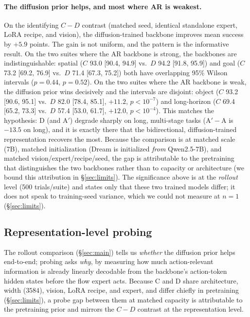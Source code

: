 \documentclass[conference]{IEEEtran}
\begin{document}
\paragraph{The diffusion prior helps, and most where AR is weakest.} On the
identifying $C-D$ contrast (matched seed, identical standalone expert, LoRA
recipe, and vision), the diffusion-trained backbone improves mean success by
$+5.9$ points. The gain is not uniform, and the pattern is the informative result.
On the two suites where the AR backbone is strong, the backbones are
indistinguishable: spatial ($C$ 93.0 [90.4, 94.9] vs.\ $D$ 94.2 [91.8, 95.9]) and
goal ($C$ 73.2 [69.2, 76.9] vs.\ $D$ 71.4 [67.3, 75.2]) both have overlapping 95\%
Wilson intervals ($p=0.44$, $p=0.52$). On the two suites where the AR backbone is
weak, the diffusion prior wins decisively and the intervals are disjoint: object
($C$ 93.2 [90.6, 95.1] vs.\ $D$ 82.0 [78.4, 85.1], $+11.2$, $p<10^{-7}$) and
long-horizon ($C$ 69.4 [65.2, 73.3] vs.\ $D$ 57.4 [53.0, 61.7], $+12.0$,
$p<10^{-4}$). This matches the hypothesis: D (and A$'$) degrade sharply on long,
multi-stage tasks (A$'-$A is $-13.5$ on long), and it is exactly there that the
bidirectional, diffusion-trained representation recovers the most. Because the
comparison is at matched scale (7B), matched initialization (Dream is initialized
\emph{from} Qwen2.5-7B), and matched vision/expert/recipe/seed, the gap is
attributable to the pretraining that distinguishes the two backbones rather than to
capacity or architecture (we bound this attribution in \S\ref{sec:limits}). The
significance above is at the \emph{rollout} level (500 trials/suite) and states
only that these two trained models differ; it does not speak to training-seed
variance, which we could not measure at $n{=}1$ (\S\ref{sec:limits}).

\subsection{Representation-level probing}
\label{sec:probing}

The rollout comparison (\S\ref{sec:main}) tells us \emph{whether} the diffusion
prior helps end-to-end; probing asks \emph{why}, by measuring how much
action-relevant information is already linearly decodable from the backbone's
action-token hidden states before the flow expert acts. Because C and D share
architecture, width ($3584$), vision, LoRA recipe, and expert, and differ chiefly
in pretraining (\S\ref{sec:limits}), a probe gap between them at matched capacity
is attributable to the pretraining prior and mirrors the $C-D$ contrast at the
representation level.
\end{document}
